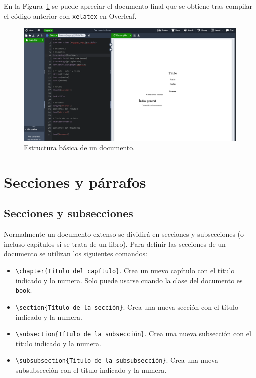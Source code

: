 \documentclass[
  a4paper,
]{scrreport}
\providecommand{\tightlist}{%
  \setlength{\itemsep}{0pt}\setlength{\parskip}{0pt}}\usepackage{longtable,booktabs,array}
\begin{document}
En la Figura~\ref{fig-overleaf-documento-base} se puede apreciar el
documento final que se obtiene tras compilar el código anterior con
\texttt{xelatex} en Overleaf.

\begin{figure}

{\centering \includegraphics{./img/estructura/overleaf-documento-base.png}

}

\caption{\label{fig-overleaf-documento-base}Estructura básica de un
documento.}

\end{figure}


\hypertarget{secciones-y-puxe1rrafos}{%
\chapter{Secciones y párrafos}\label{secciones-y-puxe1rrafos}}

\hypertarget{secciones-y-subsecciones}{%
\section{Secciones y subsecciones}\label{secciones-y-subsecciones}}

Normalmente un documento extenso se dividirá en secciones y subsecciones
(o incluso capítulos si se trata de un libro). Para definir las
secciones de un documento se utilizan los siguientes comandos:

\begin{itemize}
\tightlist
\item
  \texttt{\textbackslash{}chapter\{Título\ del\ capítulo\}}. Crea un
  nuevo capítulo con el título indicado y lo numera. Solo puede usarse
  cuando la clase del documento es \texttt{book}.
\item
  \texttt{\textbackslash{}section\{Título\ de\ la\ sección\}}. Crea una
  nueva sección con el título indicado y la numera.
\item
  \texttt{\textbackslash{}subsection\{Título\ de\ la\ subsección\}}.
  Crea una nueva subsección con el título indicado y la numera.
\item
  \texttt{\textbackslash{}subsubsection\{Título\ de\ la\ subsubsección\}}.
  Crea una nueva subsubsección con el título indicado y la numera.
\end{itemize}
\end{document}
